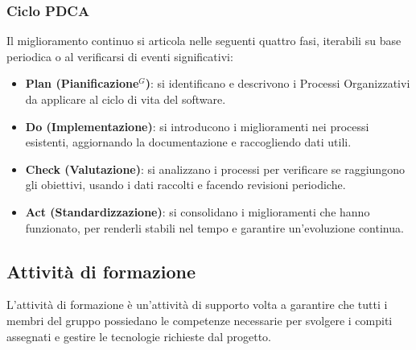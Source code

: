 \subsubsection{Ciclo PDCA}
Il miglioramento continuo si articola nelle seguenti quattro fasi, iterabili su base periodica o al verificarsi di eventi significativi:
\begin{itemize}[itemsep=3pt, parsep=1pt, label=$\scriptstyle\bullet$]
    \item \textbf{Plan (Pianificazione$^G$)}: si identificano e descrivono i Processi Organizzativi da applicare al ciclo di vita del software.
    \item \textbf{Do (Implementazione)}: si introducono i miglioramenti nei processi esistenti, aggiornando la documentazione e raccogliendo dati utili.
    \item \textbf{Check (Valutazione)}: si analizzano i processi per verificare se raggiungono gli obiettivi, usando i dati raccolti e facendo revisioni periodiche.
    \item \textbf{Act (Standardizzazione)}: si consolidano i miglioramenti che hanno funzionato, per renderli stabili nel tempo e garantire un'evoluzione continua.
\end{itemize}

\subsection{Attività di formazione}
L'attività di formazione è un'attività di supporto volta a garantire che tutti i membri del gruppo possiedano le competenze necessarie per svolgere i compiti assegnati e gestire le tecnologie richieste dal progetto.

